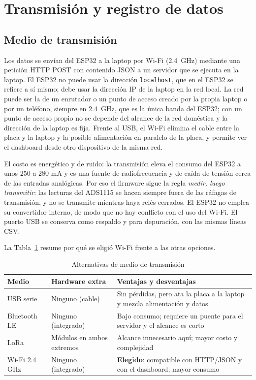 \documentclass[10pt,letterpaper,twocolumn]{article}
\begin{document}
\section{Transmisión y registro de datos}\label{sec:wifi}
\subsection{Medio de transmisión}
Los datos se envían del ESP32 a la laptop por Wi-Fi (2.4~GHz) mediante una petición HTTP POST con contenido JSON a un servidor que se ejecuta en la laptop. El ESP32 no puede usar la dirección \texttt{localhost}, que en el ESP32 se refiere a sí mismo; debe usar la dirección IP de la laptop en la red local. La red puede ser la de un enrutador o un punto de acceso creado por la propia laptop o por un teléfono, siempre en 2.4~GHz, que es la única banda del ESP32; con un punto de acceso propio no se depende del alcance de la red doméstica y la dirección de la laptop es fija. Frente al USB, el Wi-Fi elimina el cable entre la placa y la laptop y la posible alimentación en paralelo de la placa, y permite ver el dashboard desde otro dispositivo de la misma red.

El costo es energético y de ruido: la transmisión eleva el consumo del ESP32 a unos 250 a 280 mA \cite{hubble} y es una fuente de radiofrecuencia y de caída de tensión cerca de las entradas analógicas. Por eso el firmware sigue la regla \emph{medir, luego transmitir}: las lecturas del ADS1115 se hacen siempre fuera de las ráfagas de transmisión, y no se transmite mientras haya relés cerrados. El ESP32 no emplea su convertidor interno, de modo que no hay conflicto con el uso del Wi-Fi. El puerto USB se conserva como respaldo y para depuración, con las mismas líneas CSV.


La Tabla~\ref{tab:med} resume por qué se eligió Wi-Fi frente a las otras opciones.

\begin{table}[t]
\centering
\caption{Alternativas de medio de transmisión}
\label{tab:med}
\footnotesize
\begin{tabular}{@{}p{1.5cm}p{1.8cm}p{3.6cm}@{}}
\toprule
Medio & Hardware extra & Ventajas y desventajas\\
\midrule
USB serie & Ninguno (cable) & Sin pérdidas, pero ata la placa a la laptop y mezcla alimentación y datos\\
Bluetooth LE & Ninguno (integrado) & Bajo consumo; requiere un puente para el servidor y el alcance es corto\\
LoRa & Módulos en ambos extremos & Alcance innecesario aquí; mayor costo y complejidad\\
Wi-Fi 2.4 GHz & Ninguno (integrado) & \textbf{Elegido}: compatible con HTTP/JSON y con el dashboard; mayor consumo\\
\bottomrule
\end{tabular}
\end{table}
\end{document}

